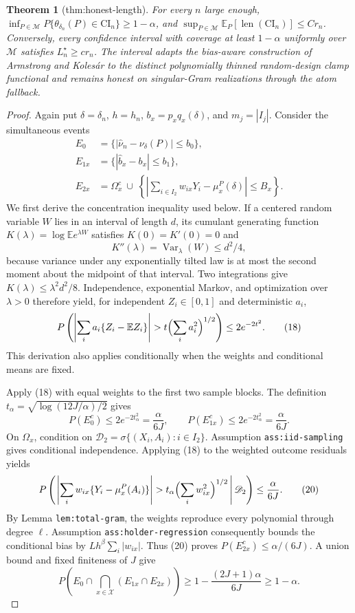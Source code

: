\documentclass{article}
\newtheorem{theorem}{Theorem}
\begin{document}
\begin{theorem}[thm:honest-length]\label{thm:honest-length}
For every \(n\) large enough, \(\inf_{P\in\mathcal M}P\{\theta_{\delta_n}(P)\in\mathrm{CI}_n\}\geq1-\alpha\), and \(\sup_{P\in\mathcal M}\mathbb E_P[\operatorname{len}(\mathrm{CI}_n)]\leq C r_n\). Conversely, every confidence interval with coverage at least \(1-\alpha\) uniformly over \(\mathcal M\) satisfies \(L_n^\star\geq c r_n\). The interval adapts the bias-aware construction of Armstrong and Kolesár to the distinct polynomially thinned random-design clamp functional and remains honest on singular-Gram realizations through the atom fallback.
\end{theorem}
\begin{proof}
Again put \(\delta=\delta_n\), \(h=h_n\), \(b_x=p_xq_x(\delta)\), and \(m_j=|I_j|\).  Consider the simultaneous events
\[
 \begin{split}
 E_0&=\{|\widehat\nu_n-\nu_\delta(P)|\leq b_0\},\\
 E_{1x}&=\{|\widehat b_x-b_x|\leq b_1\},\\
 E_{2x}&=\Omega_x^c\ \cup\
 \left\{\left|\sum_{i\in I_2}w_{ix}Y_i-\mu_x^P(\delta)\right|\leq B_x\right\}.
 \end{split} \tag{17}
\]
We first derive the concentration inequality used below.  If a centered random variable \(W\) lies in an interval of length \(d\), its cumulant generating function \(K(\lambda)=\log\mathbb E e^{\lambda W}\) satisfies \(K(0)=K'(0)=0\) and
\[
 K''(\lambda)=\operatorname{Var}_{\lambda}(W)\leq d^2/4,
\]
because variance under any exponentially tilted law is at most the second moment about the midpoint of that interval.  Two integrations give \(K(\lambda)\leq\lambda^2d^2/8\).  Independence, exponential Markov, and optimization over \(\lambda>0\) therefore yield, for independent \(Z_i\in[0,1]\) and deterministic \(a_i\),
\[
 P\left(\left|\sum_i a_i\{Z_i-\mathbb EZ_i\}\right|>
 t\Bigl(\sum_i a_i^2\Bigr)^{1/2}\right)\leq2e^{-2t^2}. \tag{18}
\]
This derivation also applies conditionally when the weights and conditional means are fixed.

Apply (18) with equal weights to the first two sample blocks.  The definition \(t_\alpha=\sqrt{\log(12J/\alpha)/2}\) gives
\[
 P(E_0^c)\leq2e^{-2t_\alpha^2}=\frac{\alpha}{6J},
 \qquad
 P(E_{1x}^c)\leq2e^{-2t_\alpha^2}=\frac{\alpha}{6J}. \tag{19}
\]
On \(\Omega_x\), condition on \(\mathscr D_2=\sigma\{(X_i,A_i):i\in I_2\}\).  Assumption \texttt{ass:iid-sampling} gives conditional independence.  Applying (18) to the weighted outcome residuals yields
\[
 P\left(\left.\left|\sum_iw_{ix}\{Y_i-\mu_x^P(A_i)\}\right|>
 t_\alpha\Bigl(\sum_iw_{ix}^2\Bigr)^{1/2}\,\right|\mathscr D_2\right)
 \leq\frac{\alpha}{6J}. \tag{20}
\]
By Lemma \texttt{lem:total-gram}, the weights reproduce every polynomial through degree \(\ell\).  Assumption \texttt{ass:holder-regression} consequently bounds the conditional bias by \(Lh^\beta\sum_i|w_{ix}|\).  Thus (20) proves \(P(E_{2x}^c)\leq\alpha/(6J)\).  A union bound and fixed finiteness of \(J\) give
\[
 P\left(E_0\cap\bigcap_{x\in\mathcal X}(E_{1x}\cap E_{2x})\right)
 \geq1-\frac{(2J+1)\alpha}{6J}\geq1-\alpha. \tag{21}
\]


\end{proof}
\end{document}
